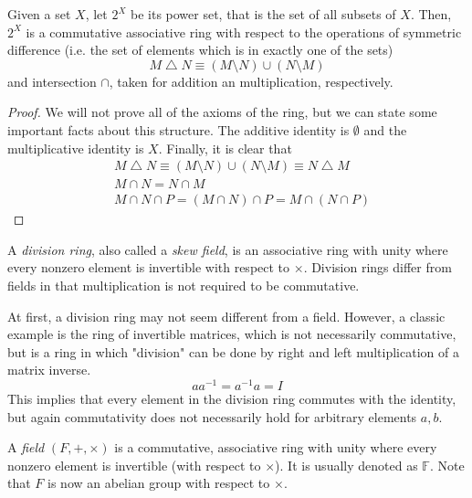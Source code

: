 \documentclass{article}
\begin{document}
\begin{proposition}
  Given a set $X$, let $2^X$ be its power set, that is the set of all subsets of $X$. Then, $2^X$ is a commutative associative ring with respect to the operations of symmetric difference (i.e. the set of elements which is in exactly one of the sets) 
  \[ M \bigtriangleup N \equiv (M \setminus N) \cup (N \setminus M) \]
  and intersection $\cap$, taken for addition an multiplication, respectively. 
\end{proposition}
\begin{proof}
  We will not prove all of the axioms of the ring, but we can state some important facts about this structure. The additive identity is $\emptyset$ and the multiplicative identity is $X$. Finally, it is clear that 
  \begin{align*}
    & M \bigtriangleup N \equiv (M \setminus N) \cup (N \setminus M) \equiv N \bigtriangleup M \\
    & M \cap N = N \cap M \\
    & M \cap N \cap P = (M \cap N) \cap P = M \cap (N \cap P)
  \end{align*}
\end{proof}

\begin{example}
  A \textit{division ring}, also called a \textit{skew field}, is an associative ring with unity where every nonzero element is invertible with respect to $\times$. Division rings differ from fields in that multiplication is not required to be commutative. 
\end{example}

At first, a division ring may not seem different from a field. However, a classic example is the ring of invertible matrices, which is not necessarily commutative, but is a ring in which "division" can be done by right and left multiplication of a matrix inverse. 
\begin{equation}
  a a^{-1} = a^{-1} a = I
\end{equation}
This implies that every element in the division ring commutes with the identity, but again commutativity does not necessarily hold for arbitrary elements $a, b$. 

\begin{definition}
  A \textit{field} $(F, +, \times)$ is a commutative, associative ring with unity where every nonzero element is invertible (with respect to $\times$). It is usually denoted as $\mathbb{F}$. Note that $F$ is now an abelian group with respect to $\times$. 
\end{definition}
\end{document}
